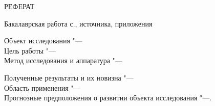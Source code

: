 \documentclass[../main.tex]{subfiles}
\begin{document}
\newpage\thispagestyle{empty}
\begin{center}
РЕФЕРАТ
\end{center}

\begin{flushleft}
Бакалаврская работа  с.,  источника,  приложения\\
\vspace{0.5cm}

\vspace{0.5cm}
Объект исследования "--- \\
\vspace{0.5cm}
Цель работы "--- \\
\vspace{0.5cm}
Метод исследования и аппаратура "---\\
\vspace{0.5cm}

Полученные результаты и их новизна "---\\
\vspace{0.5cm}
Область применения "---\\
\vspace{0.5cm}
Прогнозные предположения о развитии объекта исследования "---.
\end{flushleft}

\normalsize
\end{document}
